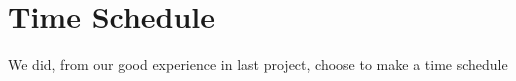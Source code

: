 \section{Time Schedule}
We did, from our good experience in last project, choose to make a time schedule 